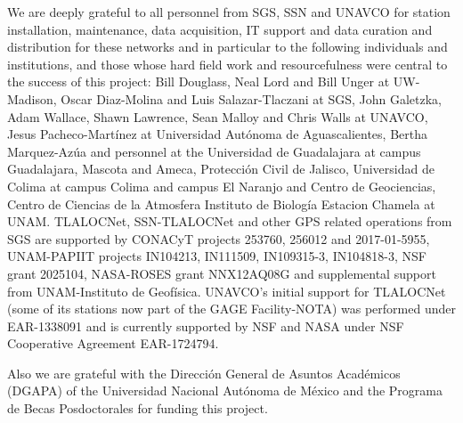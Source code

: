 \documentclass[times,twocolumn,final,authoryear]{elsarticle}
\begin{document}
We are deeply grateful to all personnel from SGS, SSN and UNAVCO for station installation, maintenance, data acquisition, IT support and data curation and distribution for these networks and in particular to the following individuals and institutions, and those whose hard field work and resourcefulness were central to the success of this project: Bill Douglass, Neal Lord and Bill Unger at UW-Madison, Oscar Diaz-Molina and Luis Salazar-Tlaczani at SGS, John Galetzka, Adam Wallace, Shawn Lawrence, Sean Malloy and Chris Walls at UNAVCO, Jesus Pacheco-Martínez at Universidad Autónoma de Aguascalientes, Bertha Marquez-Azúa and personnel at the Universidad de Guadalajara at campus Guadalajara, Mascota and Ameca, Protección Civil de Jalisco, Universidad de Colima at campus Colima and campus El Naranjo and Centro de Geociencias, Centro de Ciencias de la Atmosfera Instituto de Biología Estacion Chamela at UNAM.
TLALOCNet, SSN-TLALOCNet and other GPS related operations from SGS are supported by CONACyT projects 253760, 256012 and 2017-01-5955, UNAM-PAPIIT projects IN104213, IN111509, IN109315-3, IN104818-3, NSF grant 2025104, NASA-ROSES grant NNX12AQ08G and supplemental support from UNAM-Instituto de Geofísica. UNAVCO's initial support for TLALOCNet (some of its stations now part of the GAGE Facility-NOTA) was performed under EAR-1338091 and is currently supported by NSF and NASA under NSF Cooperative Agreement EAR-1724794.

Also we are grateful with the Direcci\'on General de Asuntos Acad\'emicos (DGAPA) of the Universidad Nacional Aut\'onoma de M\'exico and the Programa de Becas Posdoctorales for funding this project.



\end{document}
